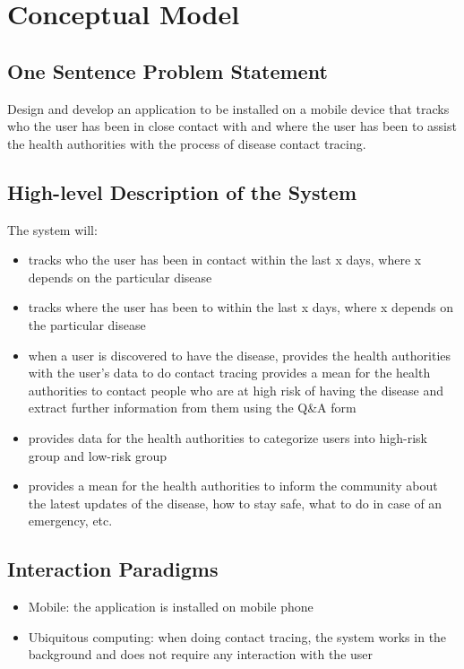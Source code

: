 \section{Conceptual Model}
  \subsection{One Sentence Problem Statement}
    \par Design and develop an application to be installed on a mobile device that tracks who the user has been in close contact with and where the user has been to assist the health authorities with the process of disease contact tracing.
  \subsection{High-level Description of the System}
    \par The system will:
    \begin{itemize}
      \item tracks who the user has been in contact within the last x days, where x depends on the particular disease
      \item tracks where the user has been to within the last x days, where x depends on the particular disease
      \item when a user is discovered to have the disease, provides the health authorities with the user's data to do contact tracing provides a mean for the health authorities to contact people who are at high risk of having the disease and extract further information from them using the Q\&A form
      \item provides data for the health authorities to categorize users into high-risk group and low-risk group
      \item provides a mean for the health authorities to inform the community about the latest updates of the disease, how to stay safe, what to do in case of an emergency, etc.
    \end{itemize}
  \subsection{Interaction Paradigms}
    \begin{itemize}
      \item Mobile: the application is installed on mobile phone
      \item Ubiquitous computing: when doing contact tracing, the system works in the background and does not require any interaction with the user
    \end{itemize}

